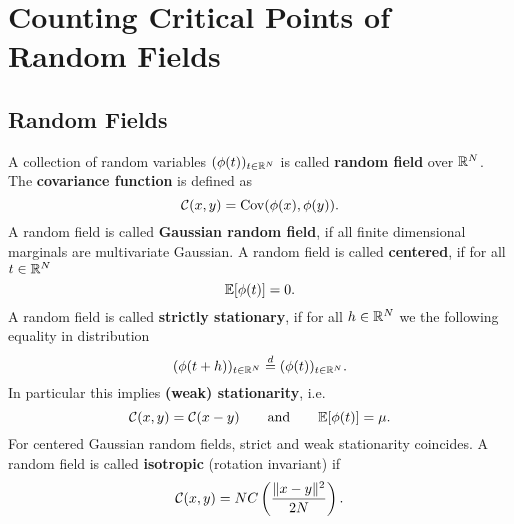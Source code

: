 \section{Counting Critical Points of Random Fields}

\subsection{Random Fields}

\begin{definition}
	A collection of random variables \((\phi(t))_{t\in\mathbb{R}^N}\) is called
	\textbf{random field} over \(\mathbb{R}^N\). The \textbf{covariance function}
	is defined as
	\begin{equation*}
		\mathcal{C}(x,y) = \operatorname{Cov}(\phi(x), \phi(y)).
	\end{equation*}
	A random field is called \textbf{Gaussian random field}, if all finite
	dimensional marginals are multivariate Gaussian.
	A random field is called \textbf{centered}, if for all \(t\in\mathbb{R}^N\)
	\[
		\mathbb{E}[\phi(t)] = 0.
	\]
	A random field is called \textbf{strictly stationary}, if for all
	\(h\in\mathbb{R}^N\) we the following equality in distribution
	\[
		(\phi(t+h))_{t\in\mathbb{R}^N} \overset{d}= (\phi(t))_{t\in\mathbb{R}^N}.
	\]
	In particular this implies	\textbf{(weak) stationarity}, i.e.
	\begin{equation*}
		\mathcal{C}(x,y) = \mathcal{C}(x-y)\qquad \text{and} \qquad \mathbb{E}[\phi(t)]=\mu.
	\end{equation*}
	For centered Gaussian random fields, strict and weak stationarity coincides.
	A random field is called \textbf{isotropic} (rotation invariant) if	
	\begin{equation*}
		\mathcal{C}(x,y) = N C\left(\frac{\|x-y\|^2}{2N}\right).
	\end{equation*}
\end{definition}

